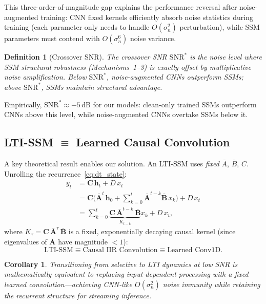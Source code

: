 \documentclass[journal]{IEEEtran}
\newtheorem{corollary}{Corollary}
\newtheorem{definition}{Definition}
\begin{document}
This three-order-of-magnitude gap explains the performance reversal after noise-augmented training: CNN fixed kernels efficiently absorb noise statistics during training (each parameter only needs to handle $O(\sigma_n^2)$ perturbation), while SSM parameters must contend with $O(\sigma_n^6)$ noise variance.

\begin{definition}[Crossover SNR]
\label{def:crossover}
The crossover SNR $\text{SNR}^*$ is the noise level where SSM structural robustness (Mechanisms~1--3) is exactly offset by multiplicative noise amplification.
Below $\text{SNR}^*$, noise-augmented CNNs outperform SSMs; above $\text{SNR}^*$, SSMs maintain structural advantage.
\end{definition}

Empirically, $\text{SNR}^* \approx -5$\,dB for our models: clean-only trained SSMs outperform CNNs above this level, while noise-augmented CNNs overtake SSMs below it.

\subsection{LTI-SSM $\equiv$ Learned Causal Convolution}
\label{sec:lti_equiv}

A key theoretical result enables our solution.
An LTI-SSM uses \emph{fixed} $\bar{A}$, $\bar{B}$, $C$.
Unrolling the recurrence~\eqref{eq:dt_state}:
\begin{align}
y_t &= \mathbf{C}\,\mathbf{h}_t + D\,x_t \nonumber\\
&= \mathbf{C}\Big(\bar{\mathbf{A}}^t\,\mathbf{h}_0 + \sum_{k=0}^{t}\bar{\mathbf{A}}^{t-k}\bar{\mathbf{B}}\,x_k\Big) + D\,x_t \nonumber\\
&= \sum_{k=0}^{t} \underbrace{\mathbf{C}\,\bar{\mathbf{A}}^{t-k}\,\bar{\mathbf{B}}}_{K_{t-k}} x_k + D\,x_t,
\label{eq:conv_unroll}
\end{align}
where $K_\tau = \mathbf{C}\,\bar{\mathbf{A}}^\tau\,\bar{\mathbf{B}}$ is a fixed, exponentially decaying causal kernel (since eigenvalues of $\bar{\mathbf{A}}$ have magnitude $< 1$):
\begin{equation}
\boxed{\text{LTI-SSM} \equiv \text{Causal IIR Convolution} \equiv \text{Learned Conv1D}.}
\label{eq:equivalence}
\end{equation}

\begin{corollary}
Transitioning from selective to LTI dynamics at low SNR is mathematically equivalent to replacing input-dependent processing with a \emph{fixed learned convolution}---achieving CNN-like $O(\sigma_n^2)$ noise immunity while retaining the recurrent structure for streaming inference.
\end{corollary}
\end{document}
